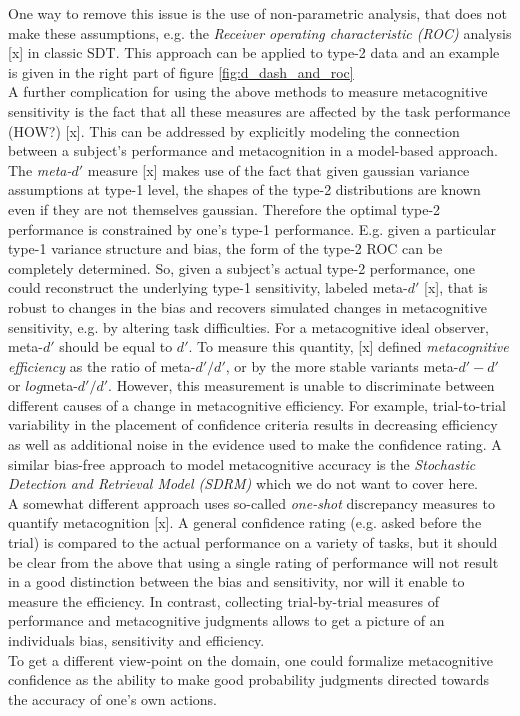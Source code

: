 \documentclass[../main/main.tex]{subfiles}
\begin{document}
	One way to remove this issue is the use of non-parametric analysis, that does not make these assumptions, e.g. the \textit{Receiver operating characteristic (ROC)} analysis [x] in classic SDT. This approach can be applied to type-2 data and an example is given in the right part of figure \ref{fig:d_dash_and_roc}\\
	A further complication for using the above methods to measure metacognitive sensitivity is the fact that all these measures are affected by the task performance (HOW?) [x]. This can be addressed by explicitly modeling the connection between a subject's performance and metacognition in a model-based approach. The \textit{meta-$d'$} measure [x] makes use of the fact that given gaussian variance assumptions at type-1 level, the shapes of the type-2 distributions are known even if they are not themselves gaussian. Therefore the optimal type-2 performance is constrained by one's type-1 performance. E.g. given a particular type-1 variance structure and bias, the form of the type-2 ROC can be completely determined. So, given a subject's actual type-2 performance, one could reconstruct the underlying type-1 sensitivity, labeled meta-$d'$ [x], that is robust to changes in the bias and recovers simulated changes in metacognitive sensitivity, e.g. by altering task difficulties. For a metacognitive ideal observer, meta-$d'$ should be equal to $d'$. To measure this quantity, [x] defined \textit{metacognitive efficiency} as the ratio of meta-$d'/d'$, or by the more stable variants meta-$d'-d'$ or $log$meta-$d'/d'$. However, this measurement is unable to discriminate between different causes of a change in metacognitive efficiency. For example,  trial-to-trial variability in the placement of confidence criteria results in decreasing efficiency as well as additional noise in the evidence used to make the confidence rating. A similar bias-free approach to model metacognitive accuracy is the \textit{Stochastic Detection and Retrieval Model (SDRM)} which we do not want to cover here.\\
	A somewhat different approach uses so-called \textit{one-shot} discrepancy measures to quantify metacognition [x]. A general confidence rating (e.g. asked before the trial) is compared to the actual performance on a variety of tasks, but it should be clear from the above that using a single rating of performance will not result in a good distinction between the bias and sensitivity, nor will it enable to measure the efficiency. In contrast, collecting trial-by-trial measures of performance and metacognitive judgments allows to get a picture of an individuals bias, sensitivity and efficiency.\\
	To get a different view-point on the domain, one could formalize metacognitive confidence as the ability to make good probability judgments directed towards the accuracy of one's own actions.
	
\end{document}
